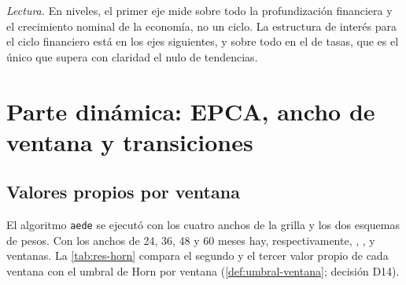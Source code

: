 \emph{Lectura.} En niveles, el primer eje mide sobre todo la profundización financiera y el
crecimiento nominal de la economía, no un ciclo. La estructura de interés para el ciclo financiero
está en los ejes siguientes, y sobre todo en el de tasas, que es el único que supera con claridad el
nulo de tendencias.

\section{Parte dinámica: EPCA, ancho de ventana y transiciones}
\label{sec:res-dinamica}

\subsection{Valores propios por ventana}
\label{sec:res-umbrales}

El algoritmo \texttt{aede} se ejecutó con los cuatro anchos de la grilla y los dos esquemas de
pesos. Con los anchos de 24, 36, 48 y 60 meses hay, respectivamente, \ventanasAedeVeinticuatro{},
\ventanasAedeTreintayseis{}, \ventanasAedeCuarentayocho{} y \ventanasAedeSesenta{} ventanas. La
\cref{tab:res-horn} compara el segundo y el tercer valor propio de cada ventana con el umbral de
Horn por ventana (\cref{def:umbral-ventana}; decisión D14).

